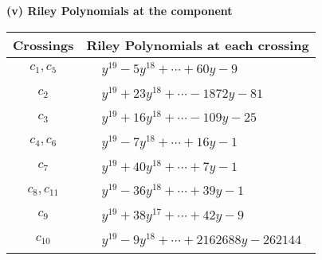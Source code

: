 \documentclass[1p]{elsarticle_modified}
\theoremstyle{definition}
\begin{document}
\newpage\renewcommand{\arraystretch}{1}
\flushleft \textbf{(v) Riley Polynomials at the component}\newline \\
\begin{tabular}{m{50pt}|m{274pt}}
Crossings & \hspace{64pt}Riley Polynomials at each crossing \\
\hline $$\begin{aligned}c_{1},c_{5}\end{aligned}$$&$\begin{aligned}
&y^{19}-5 y^{18}+\cdots+60 y-9
\end{aligned}$\\
\hline $$\begin{aligned}c_{2}\end{aligned}$$&$\begin{aligned}
&y^{19}+23 y^{18}+\cdots-1872 y-81
\end{aligned}$\\
\hline $$\begin{aligned}c_{3}\end{aligned}$$&$\begin{aligned}
&y^{19}+16 y^{18}+\cdots-109 y-25
\end{aligned}$\\
\hline $$\begin{aligned}c_{4},c_{6}\end{aligned}$$&$\begin{aligned}
&y^{19}-7 y^{18}+\cdots+16 y-1
\end{aligned}$\\
\hline $$\begin{aligned}c_{7}\end{aligned}$$&$\begin{aligned}
&y^{19}+40 y^{18}+\cdots+7 y-1
\end{aligned}$\\
\hline $$\begin{aligned}c_{8},c_{11}\end{aligned}$$&$\begin{aligned}
&y^{19}-36 y^{18}+\cdots+39 y-1
\end{aligned}$\\
\hline $$\begin{aligned}c_{9}\end{aligned}$$&$\begin{aligned}
&y^{19}+38 y^{17}+\cdots+42 y-9
\end{aligned}$\\
\hline $$\begin{aligned}c_{10}\end{aligned}$$&$\begin{aligned}
&y^{19}-9 y^{18}+\cdots+2162688 y-262144
\end{aligned}$\\
\hline
\end{tabular}\\~\\
\end{document}
